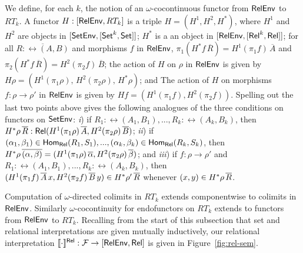 \documentclass[runningheads]{llncs}
\newcommand{\set}{\mathsf{Set}}
\newcommand{\F}{\mathcal{F}}
\begin{document}
We define, for each $k$, the notion of an $\omega$-cocontinuous
functor from $\mathsf{RelEnv}$ to $RT_k$.
A functor $H : [\mathsf{RelEnv}, RT_k]$ is a triple $H = (H^1,H^2,H^*)$,
where
$H^1$ and $H^2$ are objects in $[\setenv,[\set^k,\set]]$;
$H^*$ is a an object in $[\mathsf{RelEnv},[\mathsf{Rel}^k,\mathsf{Rel}]]$;
for all $\overline{R : \rel(A,B)}$ and morphisms $f$ in
  $\mathsf{RelEnv}$, $\pi_1(H^*f \,{\overline{R}}) = H^1 (\pi_1
  f)\,{\overline{A}}$ and $\pi_2(H^*f \,{\overline{R}}) = H^2 (\pi_2
  f)\,{\overline{B}}$;
  the action of $H$ on $\rho$ in $\mathsf{RelEnv}$ is given by $H \rho = (H^1
  (\pi_1 \rho),\,H^2 (\pi_2 \rho),\,H^*\rho)$; and 
  The action of $H$ on morphisms $f : \rho \to \rho'$ in $\mathsf{RelEnv}$
  is given by $Hf = (H^1 (\pi_1 f),H^2 (\pi_2 f))$.
Spelling out the last two points above gives the
following analogues of the three conditions
on functors on $\mathsf{SetEnv}$:
{\em i}) if $R_1 :
\rel(A_1,B_1),...,R_k : \rel(A_k,B_k)$, then $H^*\rho\, \overline{R} :
\mathsf{Rel}(H^1(\pi_1 \rho)\, \overline{A}, H^2(\pi_2 \rho)\, \overline{B})$;
{\em ii}) if $(\alpha_1, \beta_1) \in \mathsf{Hom_{Rel}}(R_1,S_1),..., (\alpha_k,
\beta_k) \in \mathsf{Hom_{Rel}}(R_k,S_k)$, then $H^*\rho\, \overline{(\alpha, \beta)} =
(H^1(\pi_1 \rho)\,\overline{\alpha}, H^2(\pi_2 \rho)\, \overline{\beta})$;
and {\em iii}) if $f : \rho \to \rho'$ and
$R_1:\rel(A_1,B_1),...,R_k:\rel(A_k,B_k)$, then $(H^1(\pi_1
f)\,{\overline{A}}\,x, H^2(\pi_2 f)\,{\overline{B}}\,y) \in H^*\rho'\,\overline{R}$
whenever $(x, y) \in H^*\rho\,\overline{R}$.

Computation of $\omega$-directed colimits in $RT_k$ extends
componentwise to colimits in $\mathsf{RelEnv}$. Similarly
$\omega$-cocontinuity for endofunctors on $RT_k$ extends to
functors from $\mathsf{RelEnv}$ to $RT_k$.  Recalling from the start of this
subsection that set and relational interpretations are given
mutually inductively,
our relational interpretation $\relsem{\cdot} : \F \to [\relenv,
\rel]$ is given in Figure~\ref{fig:rel-sem}.
\end{document}

